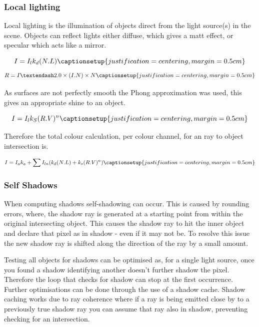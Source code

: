 \documentclass{article}
\begin{document}
\subsubsection{Local lighting}
Local lighting is the illumination of objects direct from the light source(s) in the scene. Objects can reflect lights either diffuse, which gives a matt effect, or specular which acts like a mirror. 

\begin{equation}
I = I_lk_d(N.L)
\captionsetup{justification=centering,margin=0.5cm}
\label{equ:diffuse}
\end{equation}
\begin{equation}
R = I –2.0 \times (I.N) \times N
\captionsetup{justification=centering,margin=0.5cm}
\label{equ:specular}
\end{equation}

As surfaces are not perfectly smooth the Phong approximation was used, this gives an appropriate shine to an object.

\begin{equation}
I = I_lk_S(R.V)^n
\captionsetup{justification=centering,margin=0.5cm}
\label{equ:phong}
\end{equation}

Therefore the total colour calculation, per colour channel, for an ray to object intersection is.

\begin{equation}
I = I_ak_a+ \sum I_{ln}(k_d(N.L) + k_s(R.V)^n)
\captionsetup{justification=centering,margin=0.5cm}
\label{equ:totalColour}
\end{equation}

\subsubsection{Self Shadows}
When computing shadows self-shadowing can occur. This is caused by rounding errors, where, the shadow ray is generated at a starting point from within the original intersecting object. This causes the shadow ray to hit the inner object and declare that pixel as in shadow - even if it may not be. To resolve this issue the new shadow ray is shifted along the direction of the ray by a small amount. 

Testing all objects for shadows can be optimised as, for a single light source, once you found a shadow identifying another doesn't further shadow the pixel. Therefore the loop that checks for shadow can stop at the first occurrence. Further optimisations can be done through the use of a shadow cache. Shadow caching works due to ray coherence where if a ray is being emitted close by to a previously true shadow ray you can assume that ray also in shadow, preventing checking for an intersection.
\end{document}
